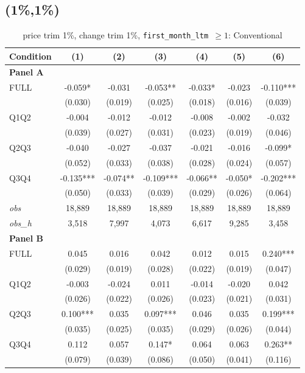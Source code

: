\subsection{(1\%,1\%)}
\begin{table}[!htbp]
\centering
\caption{price trim 1\%, change trim 1\%, \texttt{first\_month\_ltm $\geq 1$}: Conventional}
\label{tab:abc:trim11:ltm1:conventional}
\small
\begin{tabular}{lcccccc}
\toprule
Condition & (1) & (2) & (3) & (4) & (5) & (6) \\
\midrule
\textbf{Panel A} &&&&&&  \\

FULL & -0.059* & -0.031 & -0.053** & -0.033* & -0.023 & -0.110*** \\
 & (0.030) & (0.019) & (0.025) & (0.018) & (0.016) & (0.039) \\
Q1Q2 & -0.004 & -0.012 & -0.012 & -0.008 & -0.002 & -0.032 \\
 & (0.039) & (0.027) & (0.031) & (0.023) & (0.019) & (0.046) \\
Q2Q3 & -0.040 & -0.027 & -0.037 & -0.021 & -0.016 & -0.099* \\
 & (0.052) & (0.033) & (0.038) & (0.028) & (0.024) & (0.057) \\
Q3Q4 & -0.135*** & -0.074** & -0.109*** & -0.066** & -0.050* & -0.202*** \\
 & (0.050) & (0.033) & (0.039) & (0.029) & (0.026) & (0.064) \\

\textit{obs} & 18,889 & 18,889 & 18,889 & 18,889 & 18,889 & 18,889 \\
\textit{obs\_h} & 3,518 & 7,997 & 4,073 & 6,617 & 9,285 & 3,458 \\

\textbf{Panel B} &&&&&&  \\

FULL & 0.045 & 0.016 & 0.042 & 0.012 & 0.015 & 0.240*** \\
 & (0.029) & (0.019) & (0.028) & (0.022) & (0.019) & (0.047) \\
Q1Q2 & -0.003 & -0.024 & 0.011 & -0.014 & -0.020 & 0.042 \\
 & (0.026) & (0.022) & (0.026) & (0.023) & (0.021) & (0.031) \\
Q2Q3 & 0.100*** & 0.035 & 0.097*** & 0.046 & 0.035 & 0.199*** \\
 & (0.035) & (0.025) & (0.035) & (0.029) & (0.026) & (0.044) \\
Q3Q4 & 0.112 & 0.057 & 0.147* & 0.064 & 0.063 & 0.263** \\
 & (0.079) & (0.039) & (0.086) & (0.050) & (0.041) & (0.116) \\


\end{tabular}
\end{table}
